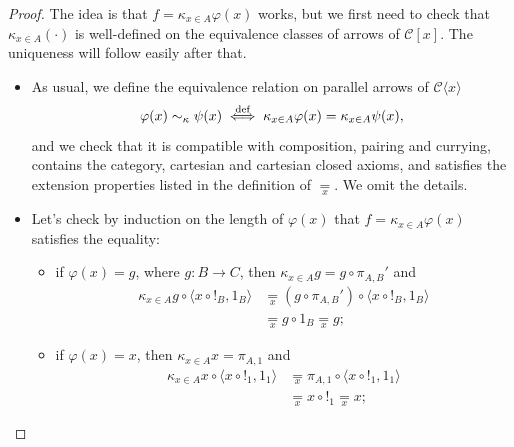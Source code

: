 \begin{proof}
    The idea is that $f = \kappa_{x \in A}\varphi(x)$ works, but we first need to check that $\kappa_{x \in A}(\cdot)$ is well-defined on the equivalence classes of arrows of $\mathcal C[x]$. The uniqueness will follow easily after that.\newline
    \begin{itemize}
        \item[$\boxed{\begin{array}{c}\textnormal{well-}\\\textnormal{definedness}\end{array}}$] As usual, we define the equivalence relation on parallel arrows of $\mathcal C\langle x\rangle$
        \[ \varphi(x) \sim_{\kappa} \psi(x) \overset{\textnormal{def}}{\iff} \kappa_{x \in A}\varphi(x) = \kappa_{x \in A}\psi(x), \]
        and we check that it is compatible with composition, pairing and currying, contains the category, cartesian and cartesian closed axioms, and satisfies the extension properties listed in the definition of $\underset{x}{=}$. We omit the details.
        \item[$\boxed{\begin{array}{c}\kappa_{x \in A}\varphi(x)\\\textnormal{works}\end{array}}$] Let's check by induction on the length of $\varphi(x)$ that $f = \kappa_{x \in A}\varphi(x)$ satisfies the equality:
        \begin{itemize}
            \item if $\varphi(x) = g$, where $g : B \to C$, then $\kappa_{x \in A}g = g \circ \pi_{A,B}'$ and
            \begin{align*}
                \kappa_{x \in A}g \circ \langle x \circ !_B, 1_B\rangle &\underset{x}{=} (g \circ \pi_{A,B}') \circ \langle x \circ !_B, 1_B\rangle \\
                                                                        &\underset{x}{=} g \circ 1_B \underset{x}{=} g;
            \end{align*}
            \item if $\varphi(x) = x$, then $\kappa_{x \in A}x = \pi_{A,1}$ and
            \begin{align*}
                \kappa_{x \in A}x \circ \langle x \circ !_1, 1_1\rangle &\underset{x}{=} \pi_{A,1} \circ \langle x \circ !_1, 1_1\rangle \\
                                                                        &\underset{x}{=} x \circ !_1 \underset{x}{=} x;

\end{align*}
\end{itemize}
\end{itemize}
\end{proof}
